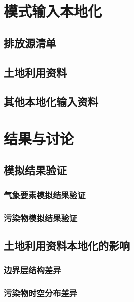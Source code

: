 \documentclass[a4paper]{article}
\begin{document}
\section{模式输入本地化}
\subsection{排放源清单}
\subsection{土地利用资料}
\subsection{其他本地化输入资料}
\section{结果与讨论}
\subsection{模拟结果验证}
\subsubsection{气象要素模拟结果验证}
\subsubsection{污染物模拟结果验证}
\subsection{土地利用资料本地化的影响}
\subsubsection{边界层结构差异}
\subsubsection{污染物时空分布差异}
\end{document}
